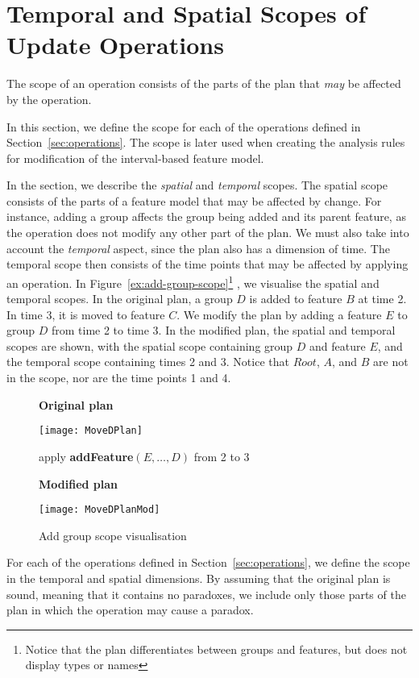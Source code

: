 
\section{Temporal and Spatial Scopes of Update Operations}
\label{sec:scope}

The scope of an operation consists of the parts of the plan that \emph{may} be affected by the operation.

In this section, we define the scope for each of the operations defined in Section~\vref{sec:operations}. The scope is later used when creating the analysis rules for modification of the interval-based feature model.

In the section, we describe the \emph{spatial} and \emph{temporal} scopes. The spatial scope consists of the parts of a feature model that may be affected by change. For instance, adding a group affects the group being added and its parent feature, as the operation does not modify any other part of the plan. We must also take into account the \emph{temporal} aspect, since the plan also has a dimension of time. The temporal scope then consists of the time points that may be affected by applying an operation. In Figure~\vref{ex:add-group-scope}\footnote{Notice that the plan differentiates between groups and features, but does not display types or names} %
, we visualise the spatial and temporal scopes. In the original plan, a group $D$ is added to feature $B$ at time 2. In time 3, it is moved to feature $C$. We modify the plan by adding a feature $E$ to group $D$ from time 2 to time 3. In the modified plan, the spatial and temporal scopes are shown, with the spatial scope containing group $D$ and feature $E$, and the temporal scope containing times 2 and 3. Notice that $Root$, $A$, and $B$ are not in the scope, nor are the time points 1 and 4.
\begin{figure}[h]
  \centering
      \textbf{Original plan}

      \texttt{[image: MoveDPlan]}
      \bigskip
      
      apply \textbf{addFeature}$(E, \ldots, D)$ from 2 to 3  
      \bigskip

      \textbf{Modified plan}

      \texttt{[image: MoveDPlanMod]}
  \caption{Add group scope visualisation}
  \label{ex:add-group-scope}
\end{figure}

For each of the operations defined in Section~\vref{sec:operations}, we define the scope in the temporal and spatial dimensions. By assuming that the original plan is sound, meaning that it contains no paradoxes, we include only those parts of the plan in which the operation may cause a paradox.

